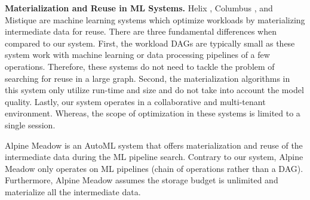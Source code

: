 \textbf{Materialization and Reuse in ML Systems.}
Helix \cite{xin2018h, xin2018helix}, Columbus \cite{zhang2016materialization}, and Mistique \cite{vartak2018mistique} are machine learning systems which optimize workloads by materializing intermediate data for reuse.
There are three fundamental differences when compared to our system.
First, the workload DAGs are typically small as these system work with machine learning or data processing pipelines of a few operations.
Therefore, these systems do not need to tackle the problem of searching for reuse in a large graph.
Second, the materialization algorithms in this system only utilize run-time and size and do not take into account the model quality.
Lastly, our system operates in a collaborative and multi-tenant environment.
Whereas, the scope of optimization in these systems is limited to a single session.

Alpine Meadow \cite{shang2019democratizing} is an AutoML system that offers materialization and reuse of the intermediate data during the ML pipeline search.
Contrary to our system, Alpine Meadow only operates on ML pipelines (chain of operations rather than a DAG). 
Furthermore, Alpine Meadow assumes the storage budget is unlimited and materialize all the intermediate data.